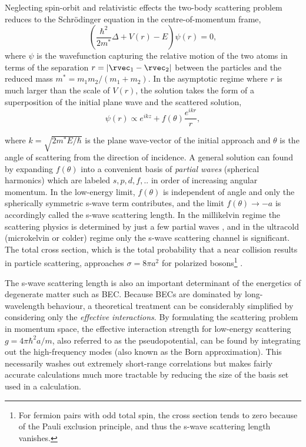 	Neglecting spin-orbit and relativistic effects the two-body scattering problem reduces to the Schr\"{o}dinger equation in the centre-of-momentum frame,
	\begin{equation}
	\left(\frac{\hbar^2}{2m^*}\Delta + V(r) - E\right)\psi(r) = 0,
	\end{equation}
	where $\psi$ is the wavefunction capturing the relative motion of the two atoms	in terms of the separation $r=|\rvec_1-\rvec_2|$ between the particles and the reduced mass $m^*=m_1m_2/(m_1+m_2)$.
	In the asymptotic regime where $r$ is much larger than the scale of $V(r)$, the solution takes the form of a superposition of the initial plane wave and the scattered solution,
	\begin{equation}
	\psi(r) \propto e^{ikz} + f(\theta)\frac{e^{ikr}}{r},
	\end{equation}

	where $k=\sqrt{2m^*E/\hbar}$ is the plane wave-vector of the initial approach and $\theta$ is the angle of scattering from the direction of incidence.
	A general solution can found by expanding $f(\theta)$ into a convenient basis of \emph{partial waves} (spherical harmonics) which are labeled $s,p,d,f,..$ in order of increasing angular momentum.
	In the low-energy limit, $f(\theta)$ is independent of angle and only the spherically symmetric s-wave term contributes, and the limit $f(\theta)\rightarrow-a$ is accordingly called the s-wave scattering length.
	In the millikelvin regime the scattering physics is determined by just a few partial waves \cite{Mcnamara07}, and in the ultracold (microkelvin or colder) regime only the s-wave scattering channel is significant.
	The total cross section, which is the total probability that a near collision results in particle scattering, approaches $\sigma=8\pi a^2$ for polarized bosons\footnote{For fermion pairs with odd total spin, the cross section tends to zero because of the Pauli exclusion principle, and thus the s-wave scattering length vanishes.} \cite{PitaevskiiStringari,Przybytek05}.
	

	The s-wave scattering length is also an important determinant of the energetics of degenerate matter such as BEC.
	Because BECs are dominated by long-wavelength behaviour, a theoretical treatment can be considerably simplified by considering only the \emph{effective interactions}.
	By formulating the scattering problem in momentum space, the effective interaction strength for low-energy scattering  $g=4\pi \hbar^2 a/m$, also referred to as the pseudopotential, can be found by integrating out the high-frequency modes (also known as the Born approximation).
	This necessarily washes out extremely short-range correlations but makes fairly accurate calculations much more tractable by reducing the size of the basis set used in a calculation.

